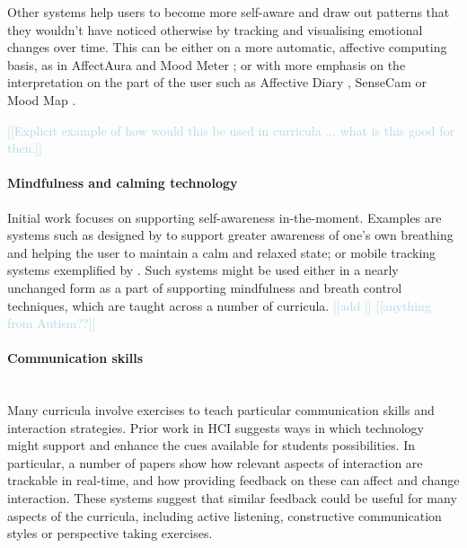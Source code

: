 \documentclass[prodmode,acmtochi]{acmsmall}
\newcommand{\todo}[1]{\textrm{\textrm{\textcolor{LightBlue}{[[#1]]} } } }
\begin{document}
Other systems help users to become more self-aware and draw out patterns that they wouldn't have noticed otherwise by tracking and visualising emotional changes over time. This can be either on a more automatic, affective computing basis, as in AffectAura \cite{McDuff2012} and Mood Meter \cite{Hernandez2012}; or with more emphasis on the interpretation on the part of the user such as Affective Diary \cite{Stahl2008,Sengers2007,Hook2008}, SenseCam \cite{Kalnikaite2010,Fleck2009} or Mood Map \cite{Morris2010}.  

\todo{Explicit example of how would this be used in curricula ... what is this good for then.}

\paragraph{Mindfulness and calming technology}
Initial work focuses on supporting self-awareness in-the-moment. Examples are  systems such as designed by  to support greater awareness of one's own breathing and helping the user to maintain a calm and relaxed state; or mobile tracking systems exemplified by . Such systems might be used either in a nearly unchanged form as a part of supporting mindfulness and breath control techniques, which are taught across a number of curricula. 
\todo{add \cite{Vidyarthi2014}}
\todo{anything from Autism??}

\paragraph{Communication skills}~\\
\label{sec:strategies}
Many curricula involve exercises to teach particular communication skills and interaction strategies. Prior work in HCI suggests ways in which technology might support and enhance the cues available for students possibilities. In particular, a number of papers show how relevant aspects of interaction are trackable in real-time, and how providing feedback on these can affect and change interaction. These systems suggest that similar feedback could be useful for many aspects of the curricula, including active listening, constructive communication styles or perspective taking exercises.
\end{document}
